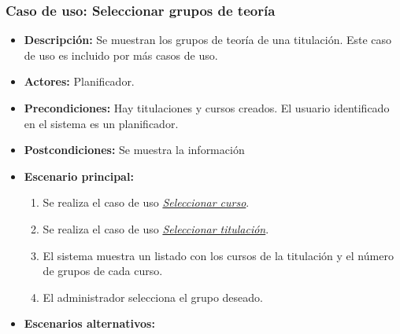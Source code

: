 \subsubsection*{Caso de uso: Seleccionar grupos de teoría}
\label{select_grupo}
\begin{itemize}
\item{\bf Descripción:} Se muestran los grupos de teoría de una titulación. Este caso de uso es incluido por más casos de uso.
\item{\bf Actores:} Planificador.
\item{\bf Precondiciones:} Hay titulaciones y cursos creados. El usuario identificado en el sistema es un planificador.
\item{\bf Postcondiciones:} Se muestra la información
\item{\bf Escenario principal:}
	\begin{enumerate}
	\item Se realiza el caso de uso {\em \hyperref[select_curso]{Seleccionar curso}}.
	\item Se realiza el caso de uso {\em \hyperref[select_titulacion]{Seleccionar titulación}}.
	\item El sistema muestra un listado con los cursos de la titulación y el número de grupos de cada curso.
	\item El administrador selecciona el grupo deseado.
	\end{enumerate}
\item{\bf Escenarios alternativos:}
\end{itemize}



